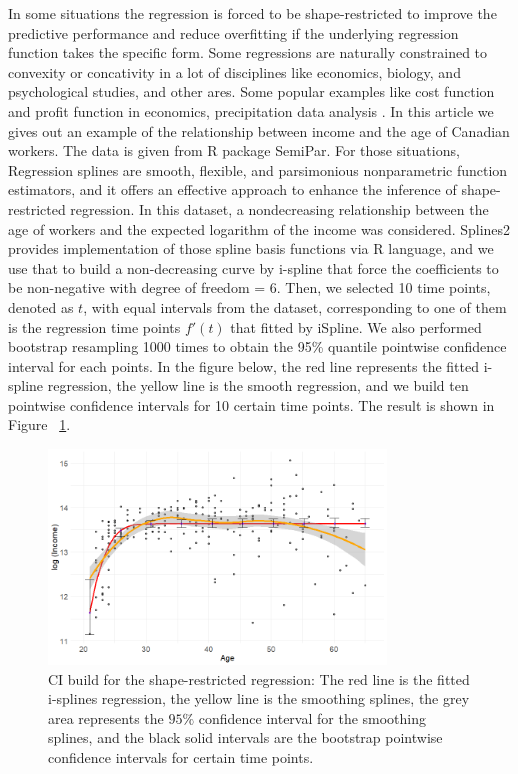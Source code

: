 \documentclass[12pt]{article}
\begin{document}
In some situations the regression is forced to be shape-restricted to improve
the predictive performance and reduce overfitting if the underlying regression 
function takes the specific form. Some regressions are naturally constrained to
convexity or concativity in a lot of disciplines like economics, biology, and 
psychological studies, and other ares.\cite{jieying2022heteroscedastic} 
\cite{guntuboyina2018nonparametric} Some popular examples like cost function and 
profit function in economics\cite{gallant1984imposing}, precipitation data analysis
\cite{molitor2002bayesian}. In this article we gives out an example of the 
relationship between income and the age of Canadian workers. The data is given from
R package SemiPar. For those situations, Regression splines are smooth, flexible, 
and parsimonious nonparametric function estimators, and it offers an effective approach
to enhance the inference of shape-restricted regression. \cite{meyer2008inference} 
In this dataset, a nondecreasing relationship between the age of workers and the 
expected logarithm of the income was considered. \cite{wang2021shape}  Splines2 provides
implementation of those spline basis functions via R language, and we use that to build 
a non-decreasing curve by i-spline that force the coefficients to be non-negative with
degree of freedom = 6. Then, we selected 10 time points, denoted as $t$, with equal 
intervals from the dataset, corresponding to one of them is the regression time points
\(f'(t)\) that fitted by iSpline. We also performed bootstrap resampling 1000 times to
obtain the 95\% quantile pointwise confidence interval for each points. In the figure
below, the red line represents the fitted i-spline regression, the yellow line is the
smooth regression, and we build ten pointwise confidence intervals for 10 certain time
points. The result is shown in Figure ~\ref{fig:semipar}.


\begin{figure}[H]
  \centering
  \includegraphics[width=0.8\textwidth]{SemiparCI.png}
  \caption{CI build for the shape-restricted regression: The red line is the 
  fitted i-splines regression, the yellow line is the smoothing splines, the
  grey area represents the \(95\%\) confidence interval for the smoothing splines, 
  and the black solid intervals are the bootstrap pointwise confidence intervals for
  certain time points. }
  \label{fig:semipar}
\end{figure}
\end{document}
